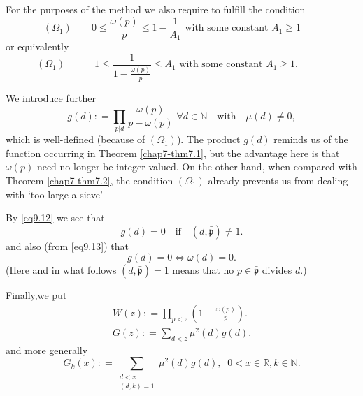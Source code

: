 For the purposes of the method we also require to fulfill the
condition  
\begin{equation*}
(\Omega_1 ) \qquad  0 \leq \frac{\omega(p)}{p} \leq 1-
  \frac{1}{A_1} \text{  with some constant } A_1 \geq 1 \qquad 
  \tag*{$(9.16_a)$}\label{eq9.16}  
\end{equation*}
or equivalently 
\begin{equation*} 
(\Omega_1 ) \qquad\quad   1 \leq \frac{1}{1- \frac{\omega(p)}{p}} \leq
  A_1 \text{ with  some constant } A_1 \geq 1 . \quad \qquad
  \tag*{$(9.16_b)$}\label{eq9.16b}  
\end{equation*}

We introduce further 
\begin{equation*}
g(d): = \prod_{p|d} \frac{\omega(p)}{p- \omega(p)} \; \forall d \in
\mathbb{N}\quad \text{with}\quad \mu (d) \neq 0,\tag{9.17}\label{eq9.17} 
\end{equation*}
which is well-defined (because of $(\Omega_1)$). The product $g(d)$
reminds us of the function occurring in Theorem \ref{chap7-thm7.1}, but the
advantage here is that $\omega (p)$ need no longer be
integer-valued. On the other hand, when compared with Theorem
\ref{chap7-thm7.2}, 
the condition $(\Omega_1)$ already prevents us from dealing with `too
large a sieve' 

By \eqref{eq9.12} we see that 
\begin{equation*}
g(d) = 0\quad \text{if}\quad ( d,\bar{\mathfrak{p}}) \neq
1.\tag{9.18}\label{eq9.18} 
\end{equation*}
and also (from \eqref{eq9.13}) that 
\begin{equation*}
g(d) = 0 \Longleftrightarrow \omega(d) = 0.\tag{9.19}\label{eq9.19} 
\end{equation*}
(Here and in what follows $(d,\bar{\mathfrak{p}})=1$ means that no $p
\in \bar{\mathfrak{p}}$ divides $d$.) 

Finally,\pageoriginale we put
\begin{gather*}
W(z): = \prod_{p<z}(1- \frac{\omega(p)}{p}).\tag{9.20}\label{eq9.20}\\
G(z) : = \sum_{ d < z } \mu^2(d) g(d).\tag{9.21}\label{eq9.21}
\end{gather*}
and more generally 
\begin{equation*}
G_k(x) : = \sum_{\substack{d < x \\ {(d,k)=1}}} \mu^2(d) g(d), \;\;  0< x
\in \mathbb{R}, k \in \mathbb{N}.\tag{9.22}\label{eq9.22} 
\end{equation*}

